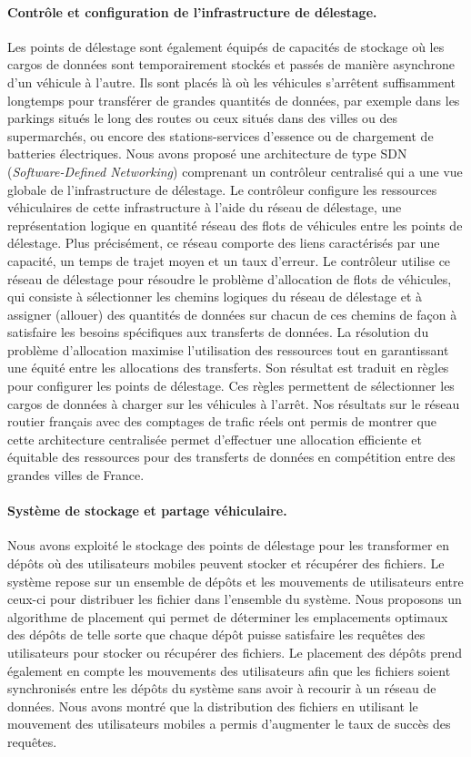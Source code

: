  
\paragraph{Contrôle et configuration de l’infrastructure de délestage.} 
Les points de délestage sont également équipés de capacités de stockage où les cargos de données sont temporairement stockés et passés de manière asynchrone d’un véhicule à l’autre. Ils sont placés là où les véhicules s’arrêtent suffisamment longtemps pour transférer de grandes quantités de données, par exemple dans les parkings situés le long des routes ou ceux situés dans des villes ou des supermarchés, ou encore des stations-services d’essence ou de chargement de batteries électriques. Nous avons proposé une architecture de type SDN (\textit{Software-Defined Networking}) comprenant un contrôleur centralisé qui a une vue globale de l’infrastructure de délestage. Le contrôleur configure les ressources véhiculaires de cette infrastructure à l’aide du réseau de délestage, une représentation logique en quantité réseau des flots de véhicules entre les points de délestage. Plus précisément, ce réseau comporte des liens caractérisés par une capacité, un temps de trajet moyen et un taux d’erreur. Le contrôleur utilise ce réseau de délestage pour résoudre le problème d’allocation de flots de véhicules, qui consiste à sélectionner les chemins logiques du réseau de délestage et à assigner (allouer) des quantités de données sur chacun de ces chemins de façon à satisfaire les besoins spécifiques aux transferts de données. La résolution du problème d’allocation maximise l’utilisation des ressources tout en garantissant une équité entre les allocations des transferts. Son résultat est traduit en règles pour configurer les points de délestage. Ces règles permettent de sélectionner les cargos de données à charger sur les véhicules à l'arrêt. Nos résultats sur le réseau routier français avec des comptages de trafic réels ont permis de montrer que cette architecture centralisée permet d’effectuer une allocation efficiente et équitable des ressources pour des transferts de données en compétition entre des grandes villes de France. 
 
 
\paragraph{Système de stockage et partage véhiculaire.} 
Nous avons exploité le stockage des points de délestage pour les transformer en dépôts où des utilisateurs mobiles peuvent stocker et récupérer des fichiers. Le système repose sur un ensemble de dépôts et les mouvements de utilisateurs entre ceux-ci pour distribuer les fichier dans l’ensemble du système. Nous proposons un algorithme de placement qui permet de déterminer les emplacements optimaux des dépôts de telle sorte que chaque dépôt puisse satisfaire les requêtes des utilisateurs pour stocker ou récupérer des fichiers. Le placement des dépôts prend également en compte les mouvements des utilisateurs afin que les fichiers soient synchronisés entre les dépôts du système sans avoir à recourir à un réseau de données. Nous avons montré que la distribution des fichiers en utilisant le mouvement des utilisateurs mobiles a permis d’augmenter le taux de succès des requêtes. 
 
